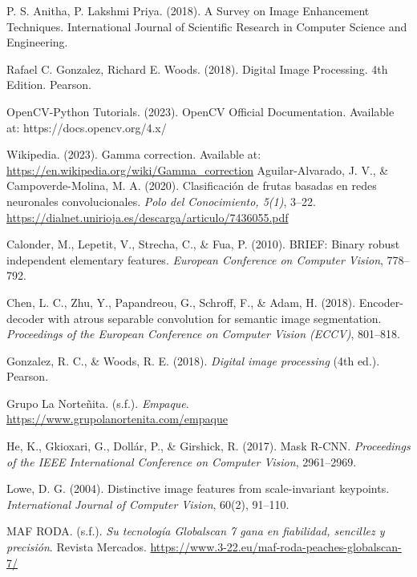 \documentclass[12pt,letterpaper]{article}
\begin{document}
\begin{thebibliography}{99}

P. S. Anitha, P. Lakshmi Priya. (2018). A Survey on Image Enhancement Techniques. International Journal of Scientific Research in Computer Science and Engineering.

Rafael C. Gonzalez, Richard E. Woods. (2018). Digital Image Processing. 4th Edition. Pearson.

OpenCV-Python Tutorials. (2023). OpenCV Official Documentation. Available at: https://docs.opencv.org/4.x/

Wikipedia. (2023). Gamma correction. Available at: \url{https://en.wikipedia.org/wiki/Gamma_correction}
Aguilar-Alvarado, J. V., \& Campoverde-Molina, M. A. (2020). Clasificación de frutas basadas en redes neuronales convolucionales. \textit{Polo del Conocimiento, 5(1)}, 3–22. \url{https://dialnet.unirioja.es/descarga/articulo/7436055.pdf}

Calonder, M., Lepetit, V., Strecha, C., \& Fua, P. (2010). BRIEF: Binary robust independent elementary features. \textit{European Conference on Computer Vision}, 778--792.

Chen, L. C., Zhu, Y., Papandreou, G., Schroff, F., \& Adam, H. (2018). Encoder-decoder with atrous separable convolution for semantic image segmentation. \textit{Proceedings of the European Conference on Computer Vision (ECCV)}, 801--818.

Gonzalez, R. C., \& Woods, R. E. (2018). \textit{Digital image processing} (4th ed.). Pearson.

Grupo La Norteñita. (s.f.). \textit{Empaque}. \url{https://www.grupolanortenita.com/empaque}

He, K., Gkioxari, G., Dollár, P., \& Girshick, R. (2017). Mask R-CNN. \textit{Proceedings of the IEEE International Conference on Computer Vision}, 2961--2969.

Lowe, D. G. (2004). Distinctive image features from scale-invariant keypoints. \textit{International Journal of Computer Vision}, 60(2), 91--110.

MAF RODA. (s.f.). \textit{Su tecnología Globalscan 7 gana en fiabilidad, sencillez y precisión}. Revista Mercados. \url{https://www.3-22.eu/maf-roda-peaches-globalscan-7/}


\end{thebibliography}
\end{document}
